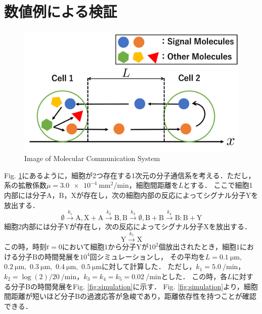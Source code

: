 \documentclass[twocolumn]{jarticle}
\begin{document}
\section{数値例による検証}
\begin{figure}[tb]
    \centering
    \includegraphics[width=0.8\columnwidth] {figures/Images.pdf}
    \caption{Image of Molecular Communication System}
    \label{fig:image}
\end{figure}
Fig. \ref{fig:image}にあるように，細胞が2つ存在する1次元の分子通信系を考える．ただし，系の拡散係数$\mu=$$\SI{3.0e-4}{\milli\meter\squared\per\minute}$，細胞間距離を$L$とする．
ここで細胞1内部には分子$\mathrm{A}$，$\mathrm{B}$，$\mathrm{X}$が存在し，次の細胞内部の反応によってシグナル分子$\mathrm{Y}$を放出する．
\begin{equation}
    \emptyset \xrightarrow{k_1} \mathrm{A},\mathrm{X}+\mathrm{A} \xrightarrow{k_2} \mathrm{B}, \mathrm{B} \xrightarrow{k_3} \emptyset, \mathrm{B}+\mathrm{B}\xrightarrow{k_4} \mathrm{B:B} +\mathrm{Y}
\end{equation}
細胞2内部には分子$\mathrm{Y}$が存在し，次の反応によってシグナル分子$\mathrm{X}$を放出する．
\begin{equation}
    \mathrm{Y} \xrightarrow{k_5} \mathrm{X}
\end{equation}
この時，時刻$t=0$において細胞$1$から分子$\mathrm{Y}$が$10^2$個放出されたとき，細胞$1$における分子$\mathrm{B}$の時間発展を$10^4$回シミュレーションし，
その平均を$L=\SI{0.1}{\um},$ $\SI{0.2}{\um},$ $\SI{0.3}{\um},$ $\SI{0.4}{\um},$ $\SI{0.5}{\um}$に対して計算した．
ただし，$k_1 = \SI{5.0}{\per\minute}$，$k_2 = \log(2)/20\ \si{\per\minute}$，$k_3=k_4=k_5=\SI{0.02}{\per\minute}$とした．
この時，各$L$に対する分子Bの時間発展をFig. \ref{fig:simulation}に示す．
Fig. \ref{fig:simulation}より，細胞間距離が短いほど分子$\mathrm{B}$の過渡応答が急峻であり，距離依存性を持つことが確認できる．
\end{document}
